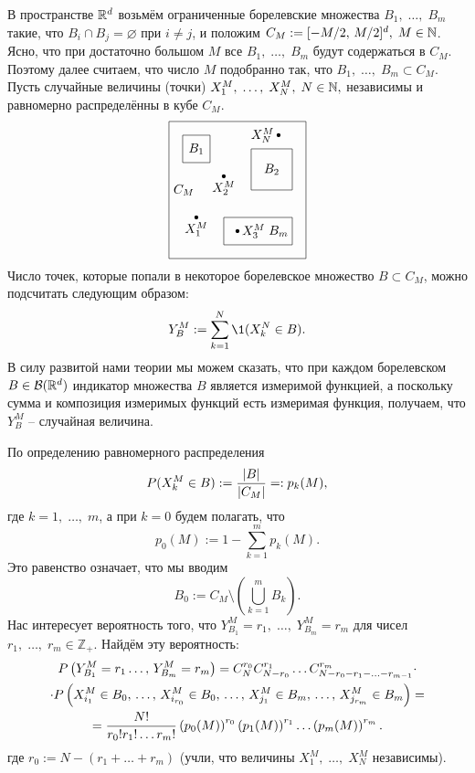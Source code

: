 В пространстве $\R^d$ возьмём ограниченные борелевские множества $B_1,\;\ldots,\;B_m$ такие, что $B_i\cap B_j=\varnothing$ при $i\neq j$, и положим $C_M:=[-M/2,\,M/2]^d,\;M\in\N$. Ясно, что при достаточно большом $M$ все $B_1,\;\ldots,\;B_m$ будут содержаться в $C_M$. Поэтому далее считаем, что число $M$ подобранно так, что $B_1,\;\ldots,\;B_m\subset C_M$. Пусть случайные величины (точки) $X_1^M,\;\ldots,\;X_N^M,\;N\in\N,$ независимы и равномерно распределённы в кубе $C_M$.
\[
\begin{tikzpicture}[>=stealth, scale=0.75]
    \draw (-4, 3) -- node[right] {$C_M$} (-4, 8) -- (1, 8) -- (1, 3) -- (-4, 3);
    \draw (-3.5, 7.5) -- (-2.5, 7.5) -- (-2.5, 6.5) -- (-3.5, 6.5) -- (-3.5, 7.5);
    \fill[black] (-3, 7) circle (0.001pt) node {$B_1$};
    \draw (-2, 3.5) -- (-2, 4.5) -- (0.5, 4.5) -- (0.5, 3.5) -- (-2, 3.5);
    \fill[black] (-0.25, 6.25) circle (0.001pt) node {$B_2$};
    \draw (0.5, 7) -- (0.5, 5.5)  -- (-1, 5.5) -- (-1, 7) -- (0.5, 7); 
    \fill[black] (-3, 4.5) circle (2pt) node[below] {$X_1^M$};
    \fill[black] (-2, 6) circle (2pt) node[below] {$X_2^M$};
    \fill[black] (-1.5, 4) circle (2pt) node[right] {$X_3^M$};
    \fill[black] (0, 7.5) circle (2pt) node[left] {$X_N^M$};
    \fill[black] (0, 4) circle (0.001pt) node {$B_m$};
\end{tikzpicture}
\]
Число точек, которые попали в некоторое борелевское множество $B\subset C_M$, можно подсчитать следующим образом:
\[ Y_{B}^M:=\sum_{k=1}^N\1(X_k^N\in B). \]
В силу развитой нами теории мы можем сказать, что при каждом борелевском $B\in\mathcal{B}(\R^d)$ индикатор множества $B$ является измеримой функцией, а поскольку сумма и композиция измеримых функций есть измеримая функция, получаем, что  $Y_B^M$ -- случайная величина. 

По определению равномерного распределения
\[ \P(X_k^M\in B):=\dfrac{|B|}{|C_M|}=:p_k(M), \]
где $k=1,\;\ldots,\;m$, а при $k=0$ будем полагать, что
\[ p_0(M):=1-\sum_{k=1}^mp_k(M). \]
Это равенство означает, что мы вводим
\[ B_0:=C_M\setminus\left(\bigcup_{k=1}^m B_k\right). \] 
Нас интересует вероятность того, что $Y_{B_1}^M=r_1,\;\ldots,\;Y_{B_m}^M=r_m$ для чисел $r_1,\;\ldots,\;r_m\in\mathbb{Z}_+$. Найдём эту вероятность:
\begin{multline*}
\P\left(Y_{B_1}^M=r_1\ldots,\,Y_{B_m}^M=r_m\right)=C_N^{r_0}C_{N-r_0}^{r_1}\ldots C_{N-r_0-r_1-\ldots-r_{m-1}}^{r_m}\cdot\\
\cdot\P\left(X_{i_1}^M\in B_0,\,\ldots,\,X_{i_{r_0}}^M\in B_0,\,\ldots,\,X_{j_{1}}^M\in B_m,\,\ldots,\, X_{j_{r_m}}^M\in B_m\right)=\\
= \dfrac{N!}{r_0!r_1!\ldots r_m!}\left(p_0(M)\right)^{r_0}\left(p_1(M)\right)^{r_1}\ldots\left(p_m(M)\right)^{r_m}.
\end{multline*}
где $r_0:=N-(r_1+\ldots+r_m)$ (учли, что величины $X_1^M,\;\ldots,\;X_N^M$ независимы). 

